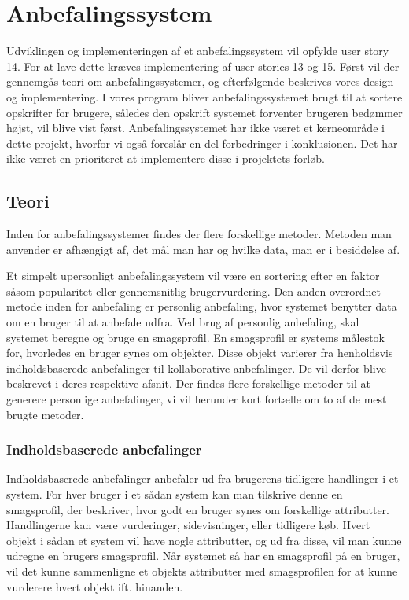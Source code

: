 \section{Anbefalingssystem}\label{anbefaling}
Udviklingen og implementeringen af et anbefalingssystem vil opfylde user story 14.
For at lave dette kræves implementering af user stories 13 og 15.
Først vil der gennemgås teori om anbefalingssystemer, og efterfølgende beskrives vores design og implementering.
I vores program bliver anbefalingssystemet brugt til at sortere opskrifter for brugere, således den opskrift systemet forventer brugeren bedømmer højst, vil blive vist først. 
Anbefalingssystemet har ikke været et kerneområde i dette projekt, hvorfor vi også foreslår en del forbedringer i konklusionen.
Det har ikke været en prioriteret at implementere disse i projektets forløb.

\subsection{Teori}
Inden for anbefalingssystemer findes der flere forskellige metoder.
Metoden man anvender er afhængigt af, det mål man har og hvilke data, man er i besiddelse af.

Et simpelt upersonligt anbefalingssystem vil være en sortering efter en faktor såsom popularitet eller gennemsnitlig brugervurdering.
Den anden overordnet metode inden for anbefaling er personlig anbefaling, hvor systemet benytter data om en bruger til at anbefale udfra.
Ved brug af personlig anbefaling, skal systemet beregne og bruge en smagsprofil.
En smagsprofil er systems målestok for, hvorledes en bruger synes om objekter. 
Disse objekt varierer fra henholdsvis indholdsbaserede anbefalinger til kollaborative anbefalinger.  
De vil derfor blive beskrevet i deres respektive afsnit. 
Der findes flere forskellige metoder til at generere personlige anbefalinger, vi vil herunder kort fortælle om to af de mest brugte metoder\citep{RecommenderSystems}.

\subsubsection{Indholdsbaserede anbefalinger}
Indholdsbaserede anbefalinger anbefaler ud fra brugerens tidligere handlinger i et system.
For hver bruger i et sådan system kan man tilskrive denne en smagsprofil, der beskriver, hvor godt en bruger synes om forskellige attributter.
Handlingerne kan være vurderinger, sidevisninger, eller tidligere køb. 
Hvert objekt i sådan et system vil have nogle attributter, og ud fra disse, vil man kunne udregne en brugers smagsprofil.
Når systemet så har en smagsprofil på en bruger, vil det kunne sammenligne et objekts attributter med smagsprofilen for at kunne vurderere hvert objekt ift. hinanden.

